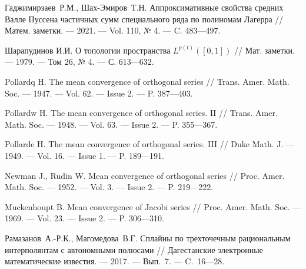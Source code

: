 \begin{thebibliography}{11}
{Гаджимирзаев~Р.М., Шах-Эмиров~Т.Н.} 
Аппроксимативные свойства средних Валле Пуссена частичных сумм специального ряда по полиномам Лагерра 
//
Матем. заметки.
--- 2021.
--- Vol. 110, № 4.
--- C. 483---497.





Шарапудинов И.И. О топологии пространства $L^{p(t)}([0,1])$ // Мат. заметки. --- 1979. --- Том 26, № 4. --- С. 613---632.





 




Pollardq H. The mean convergence of orthogonal series // Trans. Amer. Math. Soc.
--- 1947. --- Vol. 62. --- Issue 2. --- P. 387---403.





Pollardw H. The mean convergence of orthogonal series. II // Trans. Amer. Math. Soc.
--- 1948. --- Vol. 63. --- Issue 2. --- P. 355---367.





Pollarde H. The mean convergence of orthogonal series. III // Duke Math. J. --- 1949.
--- Vol. 16. --- Issue 1. --- P. 189---191.





Newman J., Rudin W. Mean convergence of orthogonal series // Proc. Amer. Math.
Soc. --- 1952. --- Vol. 3. --- Issue 2. --- P. 219---222.





Muckenhoupt B. Mean convergence of Jacobi series // Proc. Amer. Math. Soc. --- 1969.
--- Vol. 23. --- Issue 2. --- P. 306---310.





Рамазанов~А.-Р.К., Магомедова~В.Г. Сплайны по трехточечным 
рациональным интерполянтам с автономными полюсами // Дагестанские электронные
 математические известия. --- 2017. --- Вып.~7. --- C.~16---28.






\end{thebibliography}
